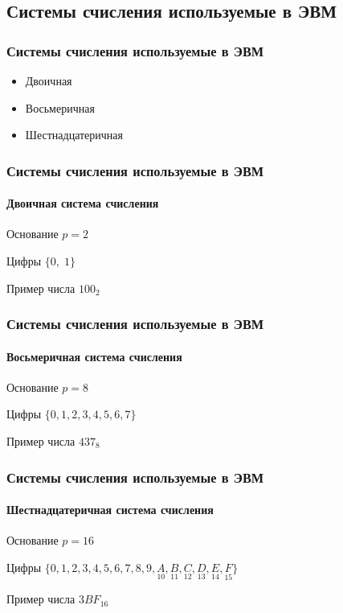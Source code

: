 \subsection{Системы счисления используемые в ЭВМ}
\begin{frame}
  \frametitle{Системы счисления используемые в ЭВМ}
	\huge
	\begin{itemize}
		\item Двоичная
		\item Восьмеричная
		\item Шестнадцатеричная
	\end{itemize}
	\normalsize
\end{frame}

\begin{frame}
  \frametitle{Системы счисления используемые в ЭВМ}
	\framesubtitle{Двоичная система счисления}
	\begin{block}{Основание}
	  $p=2$
	\end{block}
	\begin{block}{Цифры}
	  $\{0, \; 1\}$
	\end{block}
	
	\begin{block}{Пример числа}
	  $100_2$
	\end{block}
\end{frame}


\begin{frame}
  \frametitle{Системы счисления используемые в ЭВМ}
	\framesubtitle{Восьмеричная система счисления}
	\begin{block}{Основание}
	  $p=8$
	\end{block}
	\begin{block}{Цифры}
	  $\{0,1, 2, 3, 4, 5, 6, 7\}$
	\end{block}
	
	\begin{block}{Пример числа}
	  $437_8$
	\end{block}
\end{frame}


\begin{frame}
  \frametitle{Системы счисления используемые в ЭВМ}
	\framesubtitle{Шестнадцатеричная система счисления}
	\begin{block}{Основание}
	  $p=16$
	\end{block}
	\begin{block}{Цифры}
	  $\{0,1, 2, 3, 4, 5, 6, 7, 8, 9 , \underset{10}{A}, \underset{11}{B}, \underset{12}{C}, \underset{13}{D}, \underset{14}{E}, \underset{15}{F}\}$
	\end{block}
	
	\begin{block}{Пример числа}
	  $3BF_{16}$
	\end{block}
\end{frame}

